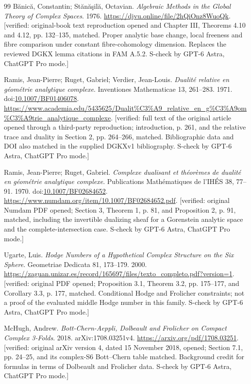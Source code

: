 \documentclass[11pt,a4paper]{article}
\theoremstyle{plain}
\theoremstyle{definition}
\begin{document}
\begin{thebibliography}{99}
B{\u a}nic{\u a}, Constantin; St{\u a}n{\u a}{\c s}il{\u a}, Octavian. \emph{Algebraic Methods in the Global Theory of Complex Spaces}. 1976. \url{https://djvu.online/file/2hQiOnz8WuoQk}. [verified: original-book text reproduction opened and Chapter III, Theorems 4.10 and 4.12, pp. 132--135, matched. Proper analytic base change, local freeness and fibre comparison under constant fibre-cohomology dimension. Replaces the reviewed DGKX lemma citations in FAM A.5.2. S-check by GPT-6 Astra, ChatGPT Pro mode.]

Ramis, Jean-Pierre; Ruget, Gabriel; Verdier, Jean-Louis. \emph{Dualit{\'e} relative en g{\'e}om{\'e}trie analytique complexe}. Inventiones Mathematicae 13, 261--283. 1971. doi:\url{10.1007/BF01406078}. \url{https://www.academia.edu/5435625/Dualit%C3%A9_relative_en_g%C3%A9om%C3%A9trie_analytique_complexe}. [verified: full text of the original article opened through a third-party reproduction; introduction, p. 261, and the relative trace and duality in Section 2, pp. 264--266, matched. Bibliographic data and DOI also matched in the supplied DGKXv1 bibliography. S-check by GPT-6 Astra, ChatGPT Pro mode.]

Ramis, Jean-Pierre; Ruget, Gabriel. \emph{Complexe dualisant et th{\'e}or{\`e}mes de dualit{\'e} en g{\'e}om{\'e}trie analytique complexe}. Publications Math{\'e}matiques de l'IH{\'E}S 38, 77--91. 1970. doi:\url{10.1007/BF02684652}. \url{https://www.numdam.org/item/10.1007/BF02684652.pdf}. [verified: original Numdam PDF opened; Section 3, Theorem 1, p. 81, and Proposition 2, p. 91, matched, including the invertible dualizing sheaf for a Gorenstein analytic space and the complete-intersection case. S-check by GPT-6 Astra, ChatGPT Pro mode.]

Ugarte, Luis. \emph{Hodge Numbers of a Hypothetical Complex Structure on the Six Sphere}. Geometriae Dedicata 81, 173--179. 2000. \url{https://zaguan.unizar.es/record/165697/files/texto_completo.pdf?version=1}. [verified: original PDF opened; Proposition 3.1, Theorem 3.2, pp. 175--177, and Corollary 3.3, p. 177, matched. Conditional Hodge and Frolicher constraints; not a proof of the evaluated middle Hodge number in this family. S-check by GPT-6 Astra, ChatGPT Pro mode.]

McHugh, Andrew. \emph{Bott-Chern-Aeppli, Dolbeault and Frolicher on Compact Complex 3-Folds}. 2018. arXiv:1708.03251v4. \url{https://arxiv.org/pdf/1708.03251}. [verified: original arXiv version 4, dated 15 November 2018, opened; Section 7.1, pp. 24--25, and its complex-S6 Bott--Chern table matched. Background credit for formulas in terms of Dolbeault and Frolicher data. S-check by GPT-6 Astra, ChatGPT Pro mode.]


\end{thebibliography}
\end{document}
